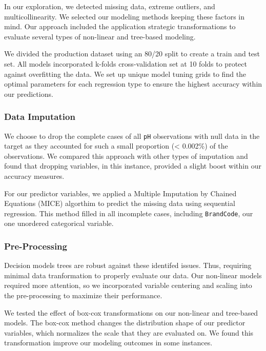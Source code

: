\documentclass[]{report}
\begin{document}
In our exploration, we detected missing data, extreme outliers, and
multicollinearity. We selected our modeling methods keeping these
factors in mind. Our approach included the application strategic
transformations to evaluate several types of non-linear and tree-based
modeling.

We divided the production dataset using an 80/20 split to create a train
and test set. All models incorporated k-folds cross-validation set at 10
folds to protect against overfitting the data. We set up unique model
tuning grids to find the optimal parameters for each regression type to
ensure the highest accuracy within our predictions.

\hypertarget{data-imputation}{%
\subsubsection{Data Imputation}\label{data-imputation}}

We choose to drop the complete cases of all \texttt{pH} observations
with null data in the target as they accounted for such a small
proportion (\textless{} 0.002\%) of the observations. We compared this
approach with other types of imputation and found that dropping
variables, in this instance, provided a slight boost within our accuracy
measures.

For our predictor variables, we applied a Multiple Imputation by Chained
Equations (MICE) algorthim to predict the missing data using sequential
regression. This method filled in all incomplete cases, including
\texttt{BrandCode}, our one unordered categorical variable.

\hypertarget{pre-processing}{%
\subsubsection{Pre-Processing}\label{pre-processing}}

Decision models trees are robust against these identifed issues. Thus,
requiring minimal data tranformation to properly evaluate our data. Our
non-linear models required more attention, so we incorporated variable
centering and scaling into the pre-processing to maximize their
performance.

We tested the effect of box-cox transformations on our non-linear and
tree-based models. The box-cox method changes the distribution shape of
our predictor variables, which normalizes the scale that they are
evaluated on. We found this transformation improve our modeling outcomes
in some instances.
\end{document}
